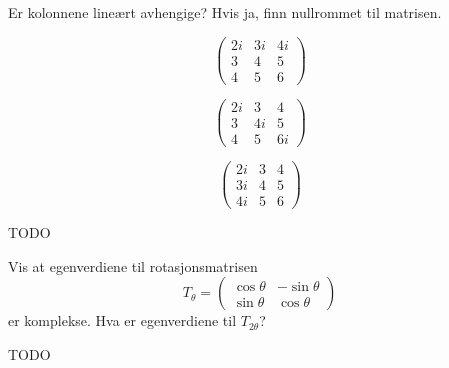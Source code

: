 
\begin{oppgave}
Er kolonnene lineært avhengige? Hvis ja, finn nullrommet til matrisen.
\begin{punkt}
\[
\begin{pmatrix}
2i & 3i & 4i \\ 3 & 4 & 5 \\ 4 & 5 & 6 
\end{pmatrix}
\]
\end{punkt}

\begin{punkt}
\[
\begin{pmatrix}
2i & 3 & 4 \\ 3 & 4i & 5 \\ 4 & 5 & 6i 
\end{pmatrix}
\]
\end{punkt}

\begin{punkt}
\[
\begin{pmatrix}
2i & 3 & 4 \\ 3i & 4 & 5 \\ 4i & 5 & 6 
\end{pmatrix}
\]
\end{punkt}
\end{oppgave}

\begin{losning}
TODO
\end{losning}


\begin{oppgave}
Vis at egenverdiene til rotasjonsmatrisen
\[
T_{\theta}=
\begin{pmatrix}
\cos \theta & -\sin \theta  \\ \sin \theta & \cos \theta  
\end{pmatrix}
\]
er komplekse. Hva er egenverdiene til $T_{2 \theta}$?
\end{oppgave}

\begin{losning}
TODO
\end{losning}

